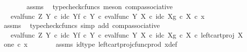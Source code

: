 \begin{isabellebody}
\ \ \ \ \ \ \isamarkupfalse%
\ assms\ \isamarkupfalse%
\ {\isacharparenleft}{\kern0pt}typecheck{\isacharunderscore}{\kern0pt}cfuncs{\isacharcomma}{\kern0pt}\ meson\ comp{\isacharunderscore}{\kern0pt}associative{}{\isacharparenright}{\kern0pt}\isanewline
\ \ \ \ \isamarkupfalse%
\ \isamarkupfalse%
\ {\isachardoublequoteopen}{\isachardot}{\kern0pt}{\isachardot}{\kern0pt}{\isachardot}{\kern0pt}\ {\isacharequal}{\kern0pt}\ {\isacharparenleft}{\kern0pt}{\isacharparenleft}{\kern0pt}eval{\isacharunderscore}{\kern0pt}func\ Z\ Y\ {\isasymcirc}\isactrlsub c\ {\isasymlangle}id\isactrlsub c\ Y{\isacharcomma}{\kern0pt}f\ {\isasymcirc}\isactrlsub c\ {\isasymbeta}\isactrlbsub Y\isactrlesub {\isasymrangle}{\isacharparenright}{\kern0pt}\ {\isasymcirc}\isactrlsub c\ eval{\isacharunderscore}{\kern0pt}func\ Y\ X\ {\isasymcirc}\isactrlsub c\ {\isasymlangle}id\isactrlsub c\ X{\isacharcomma}{\kern0pt}g\ {\isasymcirc}\isactrlsub c\ {\isasymbeta}\isactrlbsub X\isactrlesub {\isasymrangle}{\isacharparenright}{\kern0pt}\ {\isasymcirc}\isactrlsub c\ x{\isachardoublequoteclose}\isanewline
\ \ \ \ \ \ \isamarkupfalse%
\ assms\ \isamarkupfalse%
\ {\isacharparenleft}{\kern0pt}typecheck{\isacharunderscore}{\kern0pt}cfuncs{\isacharcomma}{\kern0pt}\ simp\ add{\isacharcolon}{\kern0pt}\ comp{\isacharunderscore}{\kern0pt}associative{}{\isacharparenright}{\kern0pt}\isanewline
\ \ \ \ \isamarkupfalse%
\ \isamarkupfalse%
\ {\isachardoublequoteopen}{\isachardot}{\kern0pt}{\isachardot}{\kern0pt}{\isachardot}{\kern0pt}\ {\isacharequal}{\kern0pt}\ {\isacharparenleft}{\kern0pt}{\isacharparenleft}{\kern0pt}eval{\isacharunderscore}{\kern0pt}func\ Z\ Y\ {\isasymcirc}\isactrlsub c\ {\isasymlangle}id\isactrlsub c\ Y{\isacharcomma}{\kern0pt}f\ {\isasymcirc}\isactrlsub c\ {\isasymbeta}\isactrlbsub Y\isactrlesub {\isasymrangle}{\isacharparenright}{\kern0pt}\ {\isasymcirc}\isactrlsub c\ eval{\isacharunderscore}{\kern0pt}func\ Y\ X\ {\isasymcirc}\isactrlsub c\ {\isasymlangle}id\isactrlsub c\ X{\isacharcomma}{\kern0pt}g\ {\isasymcirc}\isactrlsub c\ {\isasymbeta}\isactrlbsub X\isactrlesub {\isasymrangle}{\isacharparenright}{\kern0pt}\ {\isasymcirc}\isactrlsub c\ left{\isacharunderscore}{\kern0pt}cart{\isacharunderscore}{\kern0pt}proj\ X\ one\ {\isasymcirc}\isactrlsub c\ x{}{\isachardoublequoteclose}\isanewline
\ \ \ \ \ \ \isamarkupfalse%
\ assms\ id{\isacharunderscore}{\kern0pt}type\ left{\isacharunderscore}{\kern0pt}cart{\isacharunderscore}{\kern0pt}proj{\isacharunderscore}{\kern0pt}cfunc{\isacharunderscore}{\kern0pt}prod\ x{\isacharunderscore}{\kern0pt}def\ \isamarkupfalse%

\end{isabellebody}
